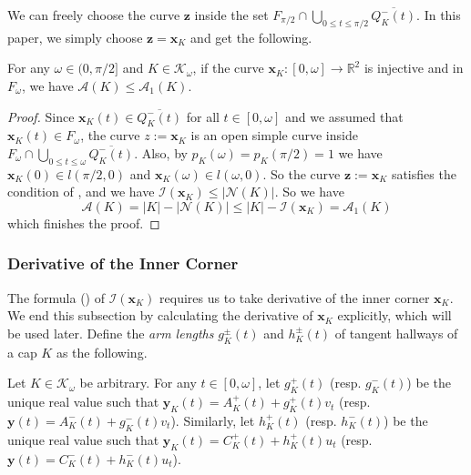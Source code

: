 We can freely choose the curve \(\mathbf{z}\) inside the set \(F_{\pi/2} \cap \bigcup_{0 \leq t \leq \pi/2} \overline{Q^-_K(t)}\). In this paper, we simply choose \(\mathbf{z} = \mathbf{x}_K\) and get the following.

\begin{theorem}

For any \(\omega \in (0, \pi/2]\) and \(K \in \mathcal{K}_{\omega}\), if the curve \(\mathbf{x}_K : [0, \omega] \to \mathbb{R}^2\) is injective and in \(F_\omega\), we have \(\mathcal{A}(K) \leq \mathcal{A}_1(K)\).

\label{thm:a1-upper-bound}
\end{theorem}

\begin{proof}
Since \(\mathbf{x}_K(t) \in \overline{Q_K^-(t)}\) for all \(t \in [0, \omega]\) and we assumed that \(\mathbf{x}_K(t) \in F_\omega\), the curve \(z := \mathbf{x}_K\) is an open simple curve inside \(F_{\omega} \cap \bigcup_{0 \leq t \leq \omega} \overline{Q^-_K(t)}\). Also, by \(p_K(\omega) = p_K(\pi/2) = 1\) we have \(\mathbf{x}_K(0) \in l(\pi/2, 0)\) and \(\mathbf{x}_K(\omega) \in l(\omega, 0)\). So the curve \(\mathbf{z} := \mathbf{x}_K\) satisfies the condition of , and we have \(\mathcal{I}(\mathbf{x}_K) \leq |\mathcal{N}(K)|\). So we have
\[
\mathcal{A}(K) = |K| - |\mathcal{N}(K)| \leq |K| - \mathcal{I}(\mathbf{x}_K) = \mathcal{A}_1(K)
\]
which finishes the proof.
\end{proof}

\subsubsection{Derivative of the Inner Corner}

The formula () of \(\mathcal{I}(\mathbf{x}_K)\) requires us to take derivative of the inner corner \(\mathbf{x}_K\). We end this subsection by calculating the derivative of \(\mathbf{x}_K\) explicitly, which will be used later. Define the \emph{arm lengths} \(g_K^{\pm}(t)\) and \(h_K^{\pm}(t)\) of tangent hallways of a cap \(K\) as the following.

\begin{definition}

Let \(K \in \mathcal{K}_\omega\) be arbitrary. For any \(t \in [0, \omega]\), let \(g_K^+(t)\) (resp. \(g_K^-(t)\)) be the unique real value such that \(\mathbf{y}_K(t) = A^+_K(t) + g_K^+(t) v_t\) (resp. \(\mathbf{y}(t) = A^-_K(t) + g_K^-(t) v_t\)). Similarly, let \(h_K^+(t)\) (resp. \(h_K^-(t)\)) be the unique real value such that \(\mathbf{y}_K(t) = C^+_K(t) + h_K^+(t) u_t\) (resp. \(\mathbf{y}(t) = C^-_K(t) + h_K^-(t) u_t\)).

\label{def:cap-tangent-arm-length}
\end{definition}

